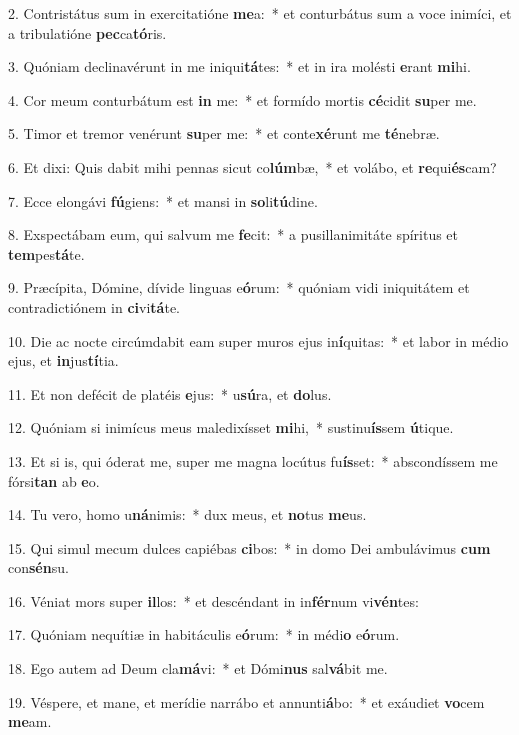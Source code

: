 2. Contristátus sum in exercitatióne \textbf{me}a:~*  et conturbátus sum a voce inimíci, et a tribulatióne \textbf{pec}ca\textbf{tó}ris.\

3. Quóniam declinavérunt in me iniqui\textbf{tá}tes:~*  et in ira molésti \textbf{e}rant \textbf{mi}hi.\

4. Cor meum conturbátum est \textbf{in} me:~*  et formído mortis \textbf{cé}cidit \textbf{su}per me.\

5. Timor et tremor venérunt \textbf{su}per me:~*  et conte\textbf{xé}runt me \textbf{té}nebræ.\

6. Et dixi: Quis dabit mihi pennas sicut co\textbf{lúm}bæ,~*  et volábo, et \textbf{re}qui\textbf{és}cam?\

7. Ecce elongávi \textbf{fú}giens:~*  et mansi in \textbf{so}li\textbf{tú}dine.\

8. Exspectábam eum, qui salvum me \textbf{fe}cit:~*  a pusillanimitáte spíritus et \textbf{tem}pes\textbf{tá}te.\

9. Præcípita, Dómine, dívide linguas e\textbf{ó}rum:~*  quóniam vidi iniquitátem et contradictiónem in \textbf{ci}vi\textbf{tá}te.\

10. Die ac nocte circúmdabit eam super muros ejus in\textbf{í}quitas:~*  et labor in médio ejus, et \textbf{in}jus\textbf{tí}tia.\

11. Et non defécit de platéis \textbf{e}jus:~*  u\textbf{sú}ra, et \textbf{do}lus.\

12. Quóniam si inimícus meus maledixísset \textbf{mi}hi,~*  sustinu\textbf{ís}sem \textbf{ú}tique.\

13. Et si is, qui óderat me, super me magna locútus fu\textbf{ís}set:~*  abscondíssem me fórsi\textbf{tan} ab \textbf{e}o.\

14. Tu vero, homo u\textbf{ná}nimis:~*  dux meus, et \textbf{no}tus \textbf{me}us.\

15. Qui simul mecum dulces capiébas \textbf{ci}bos:~*  in domo Dei ambulávimus \textbf{cum} con\textbf{sén}su.\

16. Véniat mors super \textbf{il}los:~*  et descéndant in in\textbf{fér}num vi\textbf{vén}tes:\

17. Quóniam nequítiæ in habitáculis e\textbf{ó}rum:~*  in médi\textbf{o} e\textbf{ó}rum.\

18. Ego autem ad Deum cla\textbf{má}vi:~*  et Dómi\textbf{nus} sal\textbf{vá}bit me.\

19. Véspere, et mane, et merídie narrábo et annunti\textbf{á}bo:~*  et exáudiet \textbf{vo}cem \textbf{me}am.\

